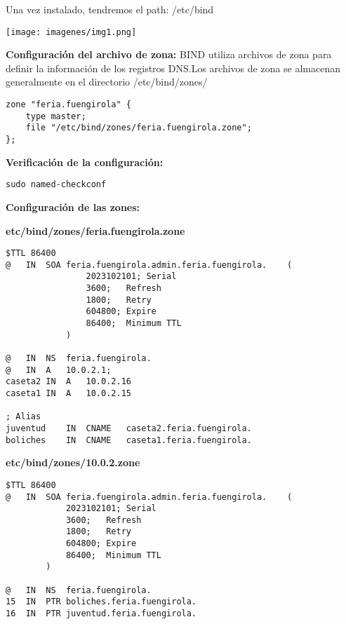 \documentclass{article}
\begin{document}
Una vez instalado, tendremos el path: /etc/bind\\

\begin{center}
\texttt{[image: imagenes/img1.png]} 
\end{center}


\textbf{Configuración del archivo de zona:}
BIND utiliza archivos de zona para definir la información de los registros DNS.Los archivos de zona se almacenan generalmente en el directorio /etc/bind/zones/
 \lstset{language=C, breaklines=true, basicstyle=\footnotesize}
\begin{lstlisting}[frame=single]
zone "feria.fuengirola" {
	type master;
	file "/etc/bind/zones/feria.fuengirola.zone";
};
\end{lstlisting}
 
 \textbf{Verificación de la configuración:}
  \lstset{language=C, breaklines=true, basicstyle=\footnotesize}
\begin{lstlisting}[frame=single]
sudo named-checkconf
\end{lstlisting}

\textbf{Configuración de las zones:}

\textbf{etc/bind/zones/feria.fuengirola.zone}

  \lstset{language=C, breaklines=true, basicstyle=\footnotesize}
\begin{lstlisting}[frame=single]
$TTL 86400
@	IN	SOA	feria.fuengirola.admin.feria.fuengirola.	(
				2023102101; Serial
				3600;	Refresh
				1800;	Retry
				604800;	Expire
				86400;	Minimum TTL
			)

@	IN	NS	feria.fuengirola.
@	IN	A	10.0.2.1;	
caseta2	IN	A	10.0.2.16
caseta1	IN	A	10.0.2.15

; Alias
juventud	IN	CNAME	caseta2.feria.fuengirola.
boliches	IN	CNAME	caseta1.feria.fuengirola.
\end{lstlisting}



\textbf{etc/bind/zones/10.0.2.zone}

  \lstset{language=C, breaklines=true, basicstyle=\footnotesize}
\begin{lstlisting}[frame=single]
$TTL 86400
@	IN	SOA	feria.fuengirola.admin.feria.fuengirola.	(
			2023102101; Serial
			3600;	Refresh
			1800;	Retry
			604800;	Expire
			86400;	Minimum TTL
		)

@	IN	NS	feria.fuengirola.
15	IN	PTR	boliches.feria.fuengirola.
16	IN	PTR	juventud.feria.fuengirola.
\end{lstlisting}
\end{document}
